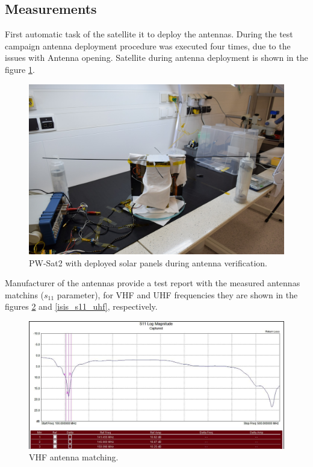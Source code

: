 \subsection{Measurements}
First automatic task of the satellite it to deploy the antennas. During the test campaign antenna deployment procedure was executed four times, due to the issues with Antenna opening. Satellite during antenna deployment is shown in the figure \ref{pwsat_with_deployed_antennas}.

\begin{figure}[H]
    \centering
    \includegraphics[width=0.6\paperwidth]{img/4/pwsat_with_deployed_antennas.JPG}
    \caption{PW-Sat2 with deployed solar panels during antenna verification.}
    \label{pwsat_with_deployed_antennas}
\end{figure}

Manufacturer of the antennas provide a test report with the measured antennas matchins ($s_{11}$ parameter), for VHF and UHF frequencies they are shown in the figures \ref{isis_s11_vhf} and  \ref{isis_s11_uhf}, respectively.

\begin{figure}[H]
    \centering
    \includegraphics[width=0.8\paperwidth]{img/4/isis_s11_vhf.png}
    \caption{VHF antenna matching.}
    \label{isis_s11_vhf}
\end{figure}

